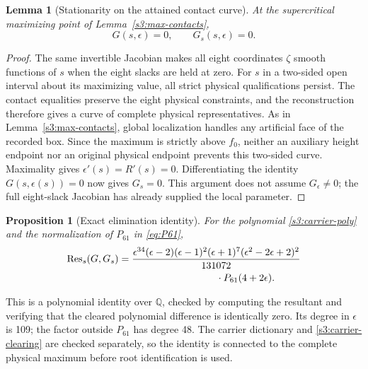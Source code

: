 \documentclass[11pt,reqno]{amsart}
\newtheorem{lemma}[theorem]{Lemma}
\newtheorem{proposition}[theorem]{Proposition}
\theoremstyle{definition}
\theoremstyle{remark}
\newcommand{\Q}{\mathbb Q}
\begin{document}
\begin{lemma}[Stationarity on the attained contact curve]
\label{s3:carrier-stationarity}
At the supercritical maximizing point of
Lemma~\ref{s3:max-contacts},
\[
 G(s,\epsilon)=0,\qquad G_s(s,\epsilon)=0.
\]
\end{lemma}

\begin{proof}
The same invertible Jacobian makes all eight coordinates \(\zeta\)
smooth functions of \(s\) when the eight slacks are held at zero.
For \(s\) in a two-sided open interval about its maximizing value,
all strict physical qualifications persist. The contact equalities
preserve the eight physical constraints, and the reconstruction
therefore gives a curve of complete physical representatives.
As in Lemma~\ref{s3:max-contacts}, global localization handles any
artificial face of the recorded box. Since the maximum is strictly
above \(f_0\), neither an auxiliary height endpoint nor an original
physical endpoint prevents this two-sided curve. Maximality gives
\(\epsilon'(s)=R'(s)=0\). Differentiating the identity
\(G(s,\epsilon(s))=0\) now gives \(G_s=0\).
This argument does not assume \(G_\epsilon\ne0\); the full
eight-slack Jacobian has already supplied the local parameter.
\end{proof}

\begin{proposition}[Exact elimination identity]\label{s3:resultant}
For the polynomial \eqref{s3:carrier-poly} and the normalization
of \(P_{61}\) in \eqref{eq:P61},
\begin{equation}\label{s3:resultant-identity}
\begin{split}
 \operatorname{Res}_s(G,G_s)
 ={}&\frac{\epsilon^{34}(\epsilon-2)(\epsilon-1)^2
             (\epsilon+1)^7(\epsilon^2-2\epsilon+2)^2}{131072}\\
 &\hspace{30mm}\cdot P_{61}(4+2\epsilon).
\end{split}
\end{equation}
\end{proposition}

This is a polynomial identity over \(\Q\), checked by computing
the resultant and verifying that the cleared polynomial difference
is identically zero. Its degree in \(\epsilon\) is 109; the
factor outside \(P_{61}\) has degree 48. The carrier dictionary
and \eqref{s3:carrier-clearing} are checked separately, so the
identity is connected to the complete physical maximum before
root identification is used.
\end{document}
